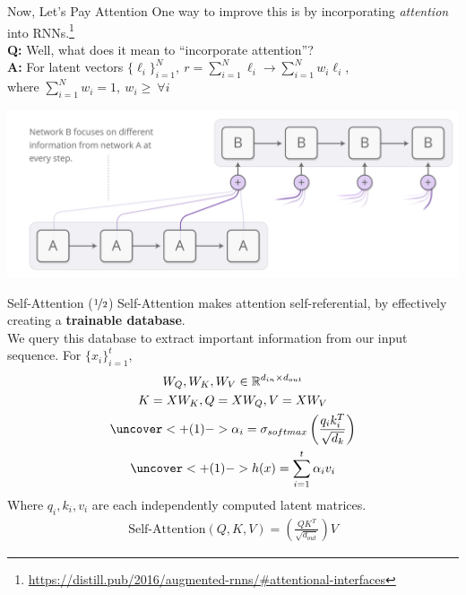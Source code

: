 \documentclass{beamer}
\begin{document}
\begin{frame}{Now, Let's Pay Attention}
	One way to improve this is by incorporating \textit{attention} into RNNs.\footnote{\tiny \url{https://distill.pub/2016/augmented-rnns/\#attentional-interfaces}} \pause \newline \\

	\textbf{Q:} Well, what does it mean to ``incorporate attention''? \pause \\
	\textbf{A:} For latent vectors $\{\ell_i\}^N_{i=1},\ r = \sum^N_{i=1} \ell_i \rightarrow \sum^N_{i=1} w_i \ell_i$, \\
	where $\sum^N_{i=1}w_i = 1,\ w_i \geq\ \forall i$ \pause

	\begin{center}
		\includegraphics[width=\textwidth]{img/rnn-attention.png}
	\end{center}
\end{frame}

\begin{frame}{Self-Attention ($\nicefrac{1}{2}$)}
	Self-Attention makes attention self-referential, by effectively creating a \textbf{trainable database}. \pause \newline \\

	We query this database to extract important information from our input sequence. For $\{x_i\}^t_{i=1}$,
	\begin{gather}
		W_Q, W_K, W_V \in \mathbb{R}^{d_{in} \times d_{out}} \\
		K = X W_K, 
		Q = X W_Q, 
		V = X W_V \\
		\uncover<+(1)->{\alpha_i = \sigma_{softmax}\left(\frac{q_i k_i^T}{\sqrt{d_k}}\right)} \\
		\uncover<+(1)->{h(x) = \sum^t_{i=1} \alpha_i v_i}
	\end{gather} \pause
	Where $q_i, k_i, v_i$ are each independently computed latent matrices.
	\begin{gather}
		\text{Self-Attention}(Q, K, V) = \left(\frac{QK^T}{\sqrt{d_{out}}}\right) V
	\end{gather}
\end{frame}
\end{document}
